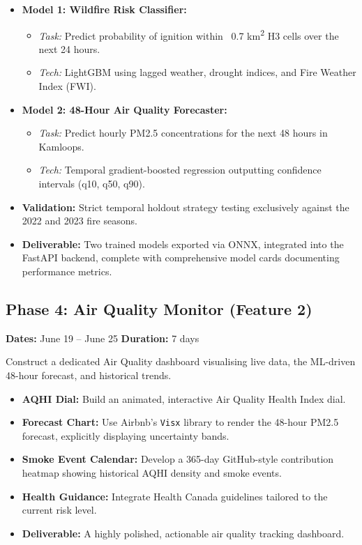\documentclass[12pt,letterpaper]{article}
\begin{document}
\begin{itemize}
    \item \textbf{Model 1: Wildfire Risk Classifier:}
    \begin{itemize}
        \item \textit{Task:} Predict probability of ignition within ~0.7 km\textsuperscript{2} H3 cells over the next 24 hours.
        \item \textit{Tech:} LightGBM using lagged weather, drought indices, and Fire Weather Index (FWI).
    \end{itemize}
    \item \textbf{Model 2: 48-Hour Air Quality Forecaster:}
    \begin{itemize}
        \item \textit{Task:} Predict hourly PM2.5 concentrations for the next 48 hours in Kamloops.
        \item \textit{Tech:} Temporal gradient-boosted regression outputting confidence intervals (q10, q50, q90).
    \end{itemize}
    \item \textbf{Validation:} Strict temporal holdout strategy testing exclusively against the 2022 and 2023 fire seasons.
    \item \textbf{Deliverable:} Two trained models exported via ONNX, integrated into the FastAPI backend, complete with comprehensive model cards documenting performance metrics.
\end{itemize}

\subsection*{Phase 4: Air Quality Monitor (Feature 2)}
\textbf{Dates:} June 19 -- June 25 \hfill \textbf{Duration:} 7 days

\begin{goalbox}
Construct a dedicated Air Quality dashboard visualising live data, the ML-driven 48-hour forecast, and historical trends.
\end{goalbox}

\begin{itemize}
    \item \textbf{AQHI Dial:} Build an animated, interactive Air Quality Health Index dial.
    \item \textbf{Forecast Chart:} Use Airbnb's \texttt{Visx} library to render the 48-hour PM2.5 forecast, explicitly displaying uncertainty bands.
    \item \textbf{Smoke Event Calendar:} Develop a 365-day GitHub-style contribution heatmap showing historical AQHI density and smoke events.
    \item \textbf{Health Guidance:} Integrate Health Canada guidelines tailored to the current risk level.
    \item \textbf{Deliverable:} A highly polished, actionable air quality tracking dashboard.
\end{itemize}
\end{document}
